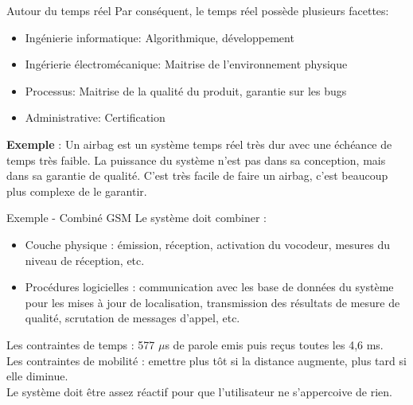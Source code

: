 \begin{frame}{Autour du temps réel}
  Par conséquent, le temps réel possède plusieurs facettes:
  \begin{itemize} 
  \item Ingénierie informatique: Algorithmique, développement
  \item  Ingérierie   électromécanique:  Maitrise  de  l'environnement
    physique
  \item Processus: Maitrise de la qualité du produit, garantie sur les
    bugs
  \item Administrative: Certification
  \end{itemize} 
  \textbf{Exemple} : Un airbag est un système temps réel très dur avec
  une échéance de temps très faible. La puissance du système n'est pas
  dans sa  conception, mais dans  sa garantie de qualité.   C'est très
  facile  de faire  un  airbag,  c'est beaucoup  plus  complexe de  le
  garantir.
\end{frame}


\begin{frame}{Exemple - Combiné GSM}
  Le système doit combiner :
  \begin{itemize}
  \item Couche physique : émission, réception, activation du vocodeur,
    mesures du niveau de réception, etc.
  \item  Procédures  logicielles  :  communication avec  les  base  de
    données  du  système  pour  les  mises  à  jour  de  localisation,
    transmission  des résultats  de mesure  de qualité,  scrutation de
    messages d'appel, etc.
  \end{itemize}

  Les  contraintes de temps  : 577  $\mu$s de  parole emis  puis reçus
  toutes les  4,6 ms.\\[3mm]

  Les  contraintes de  mobilité  :  emettre plus  tôt  si la  distance
  augmente,  plus tard si elle diminue.\\[3mm]

  Le  système  doit  être  assez  réactif pour  que  l'utilisateur  ne
  s'appercoive de rien.

\end{frame}


